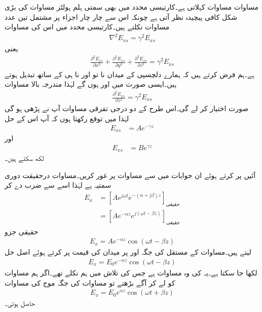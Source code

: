  مساوات    مساوات کہلاتی ہے۔کارتیسی محدد میں بھی سمتی ہلم ہولٹز مساوات کی بڑی شکل  کافی پیچیدہ نظر آتی ہے چونکہ اس سے چار چار اجزاء پر مشتمل تین عدد مساوات نکلتے ہیں۔کارتیسی محدد میں اس  کی  مساوات 
\begin{align}
\nabla^2 E_{xs}=\gamma^2 E_{xs} 
\end{align}
یعنی
\begin{align}
\frac{\partial^2  E_{xs}}{\partial x^2}+\frac{\partial^2  E_{xs}}{\partial y^2}+\frac{\partial^2  E_{xs}}{\partial z^2} =\gamma^2  E_{xs} 
\end{align}
ہے۔ہم فرض کرتے ہیں کہ ہمارے دلچسپی کے میدان نا تو  اور نا ہی  کے ساتھ تبدیل ہوتے ہیں۔ایسی صورت
 میں  اور  ہوں گے لہٰذا  مندرجہ بالا مساوات
\begin{align}
\frac{\partial^2  E_{xs}}{\partial z^2} =\gamma^2 E_{xs} 
\end{align}
صورت اختیار کر لے گی۔اس طرح کے دو درجی تفرقی مساوات آپ نے پڑھی ہو گی لہٰذا میں توقع رکھتا ہوں کہ آپ اس کے حل
\begin{align}\label{مساوات_موج_مثبت_زیڈ_جانب}
E_{xs}&=A e^{-\gamma z}
\end{align}
اور
\begin{align}\label{مساوات_موج_منفی_زیڈ_جانب}
E_{xs}&=Be^{\gamma z}
\end{align}
لکھ سکتے ہیں۔

آئیں  پر کرتے ہوئے ان جوابات میں سے مساوات  پر غور کریں۔مساوات  درحقیقت دوری سمتیہ ہے لہٰذا اسے   سے ضرب دے کر
\begin{align*}
E_x&=\left[A e^{j \omega t} e^{-(\alpha+j \beta) z} \right]_{\textrm{حقیقی}}\\
&=\left[A e^{-\alpha z} e^{j(\omega t -\beta z)} \right]_{\textrm{حقیقی}}
\end{align*}
حقیقی  جزو
\begin{align*}
E_x=A e^{-\alpha z} \cos (\omega t -\beta z)
\end{align*}
لیتے ہیں۔مساوات کے مستقل  کی جگہ  اور  پر میدان کی قیمت  پر کرتے ہوئے اصل حل
\begin{align}\label{مساوات_موج_کوسائن_مثبت_موج}
E_x=E_0 e^{-\alpha z} \cos (\omega t -\beta z)
\end{align}
لکھا جا سکتا ہے۔یہ  کی وہ مساوات  ہے جس کی تلاش میں ہم نکلے تھے۔اگر ہم مساوات  کو لے کر آگے بڑھتے تو مساوات  کی جگہ موج کی مساوات
\begin{align}\label{مساوات_موج_کوسائن_منفی_موج}
E_x=E_0 e^{\alpha z} \cos (\omega t +\beta z)
\end{align}
حاصل ہوتی۔

